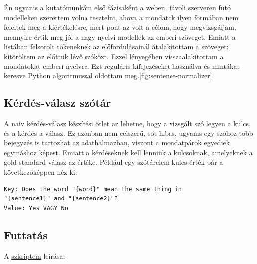 \documentclass[12pt]{report}
\theoremstyle{definition}
\begin{document}
Én ugyanis a kutatómunkám első fázisaként a weben, távoli szerveren futó modelleken szerettem volna tesztelni, ahova a mondatok ilyen formában nem feleltek meg a kiértékelésre, mert pont az volt a célom, hogy megvizsgáljam, mennyire értik meg jól a nagy nyelvi modellek az emberi szöveget. Emiatt a listában felsorolt tokeneknek az előfordulásainál átalakítottam a szöveget: kitöröltem az előttük lévő szóközt. Ezzel lényegében visszaalakítottam a mondatokat emberi nyelvre. Ezt reguláris kifejezéseket használva és mintákat keresve Python algoritmussal oldottam meg.\ref{fig:sentence-normalizer}


\subsection{Kérdés-válasz szótár}
A naiv kérdés-válasz készítési ötlet az lehetne, hogy a vizsgált szó legyen a kulcs, és a kérdés a válasz. Ez azonban nem célszerű, sőt hibás,  ugyanis egy szóhoz több bejegyzés is tartozhat az adathalmazban, viszont a mondatpárok egyediek egymáshoz képest. Emiatt a kérdéseknek kell lenniük a kulcsoknak, amelyeknek a gold standard válasz az értéke. Például egy szótárelem kulcs-érték pár a következőképpen néz ki:
\begin{lstlisting}
Key: Does the word "{word}" mean the same thing in
"{sentence1}" and "{sentence2}"?
Value: Yes VAGY No
\end{lstlisting}



\subsection{Futtatás}
A \href{https://colab.research.google.com/drive/1yA8IAd5z2oreKUXha-16Du2YrNhemNiU?usp=sharing}{szkriptem} leírása:
\end{document}
